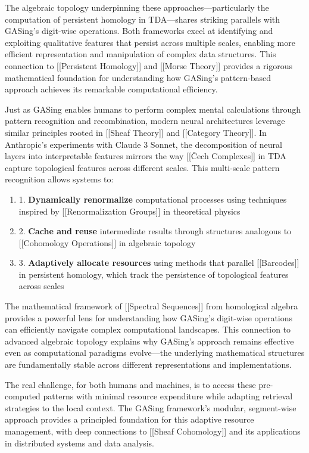 The algebraic topology underpinning these approaches—particularly the computation of persistent homology in TDA—shares striking parallels with GASing's digit-wise operations. Both frameworks excel at identifying and exploiting qualitative features that persist across multiple scales, enabling more efficient representation and manipulation of complex data structures. This connection to [[Persistent Homology]] and [[Morse Theory]] provides a rigorous mathematical foundation for understanding how GASing's pattern-based approach achieves its remarkable computational efficiency.

Just as GASing enables humans to perform complex mental calculations through pattern recognition and recombination, modern neural architectures leverage similar principles rooted in [[Sheaf Theory]] and [[Category Theory]]. In Anthropic's experiments with Claude 3 Sonnet, the decomposition of neural layers into interpretable features mirrors the way [[Čech Complexes]] in TDA capture topological features across different scales. This multi-scale pattern recognition allows systems to:

\begin{enumerate}
  \item 1. \textbf{Dynamically renormalize} computational processes using techniques inspired by [[Renormalization Groups]] in theoretical physics
  \item 2. \textbf{Cache and reuse} intermediate results through structures analogous to [[Cohomology Operations]] in algebraic topology
  \item 3. \textbf{Adaptively allocate resources} using methods that parallel [[Barcodes]] in persistent homology, which track the persistence of topological features across scales
\end{enumerate}

The mathematical framework of [[Spectral Sequences]] from homological algebra provides a powerful lens for understanding how GASing's digit-wise operations can efficiently navigate complex computational landscapes. This connection to advanced algebraic topology explains why GASing's approach remains effective even as computational paradigms evolve—the underlying mathematical structures are fundamentally stable across different representations and implementations.

The real challenge, for both humans and machines, is to access these pre-computed patterns with minimal resource expenditure while adapting retrieval strategies to the local context. The GASing framework's modular, segment-wise approach provides a principled foundation for this adaptive resource management, with deep connections to [[Sheaf Cohomology]] and its applications in distributed systems and data analysis.

